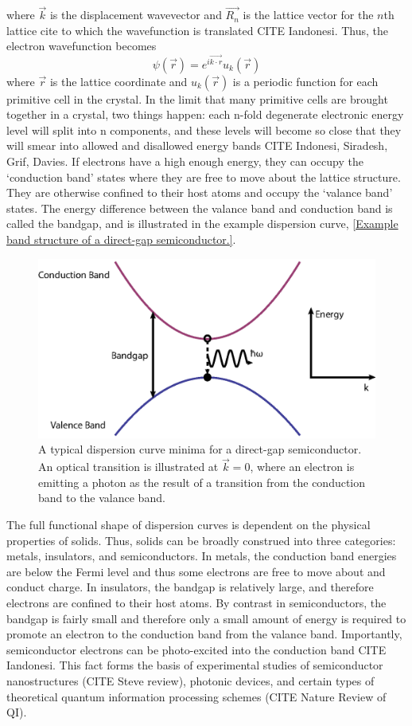 where $\vec{k}$ is the displacement wavevector and  $\vec{R_n}$ is the lattice vector for the $n$th lattice cite to which the wavefunction is translated CITE Iandonesi. Thus, the electron wavefunction becomes 
 \begin{equation}
 \psi(\vec{r}) = e^{i \vec{k\cdot r}} u_k(\vec{r})
 \end{equation}
where $\vec{r}$ is the lattice coordinate and $u_k(\vec{r})$ is a periodic function for each primitive cell in the crystal. In the limit that many primitive cells are brought together in a crystal, two things happen: each n-fold degenerate electronic energy level will split into n components, and these levels will become so close that they will smear into allowed and disallowed energy bands CITE Indonesi, Siradesh, Grif, Davies. If electrons have a high enough energy, they can occupy the `conduction band' states where they are free to move about the lattice structure. They are otherwise confined to their host atoms and occupy the `valance band' states. The energy difference between the valance band and conduction band is called the bandgap, and is illustrated in the example dispersion curve, \ref{Example band structure of a direct-gap semiconductor.}. 

\begin{figure}[h!]
\centering
\includegraphics[width = .7\textwidth]{dispcurve.eps}
\caption{A typical dispersion curve minima for a direct-gap semiconductor. An optical transition is illustrated at $\vec{k} = 0$, where an electron is emitting a photon as the result of a transition from the conduction band to the valance band.}
\label{ExampleBands}
\end{figure}

\indent The full functional shape of dispersion curves is dependent on the physical properties of solids. Thus, solids can be broadly construed into three categories: metals, insulators, and semiconductors. In metals, the conduction band energies are below the Fermi level and thus some electrons are free to move about and conduct charge. In insulators, the bandgap is relatively large, and therefore electrons are confined to their host atoms. By contrast in semiconductors, the bandgap is fairly small and therefore only a small amount of energy is required to promote an electron to the conduction band from the valance band. Importantly, semiconductor electrons can be photo-excited into the conduction band CITE Iandonesi. This fact forms the basis of experimental studies of semiconductor nanostructures (CITE Steve review), photonic devices, and certain types of theoretical quantum information processing schemes (CITE Nature Review of QI).

